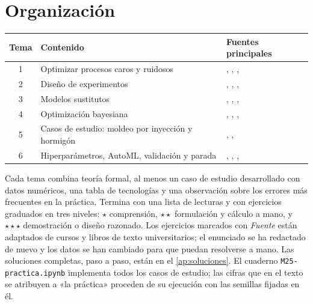 \documentclass[11pt,a4paper,twoside,openany]{book}
\begin{document}
\section*{Organización}
\begin{center}\small
\begin{tabular}{@{}cll@{}}
\toprule
Tema & Contenido & Fuentes principales \\
\midrule
1 & Optimizar procesos caros y ruidosos & \cite{garnett}, \cite{frazier}, \cite{kw}, \cite{mn} \\
2 & Diseño de experimentos & \cite{montgomery}, \cite{psu503}, \cite{mckay}, \cite{boxwilson} \\
3 & Modelos sustitutos & \cite{rw}, \cite{garnett}, \cite{lakshmi}, \cite{raissi} \\
4 & Optimización bayesiana & \cite{jones}, \cite{frazier}, \cite{garnett}, \cite{srinivas} \\
5 & Casos de estudio: moldeo por inyección y hormigón & \cite{fernandes}, \cite{ament}, \cite{shields} \\
6 & Hiperparámetros, AutoML, validación y parada & \cite{feurer}, \cite{bergstra12}, \cite{tpe}, \cite{hyperband} \\
\bottomrule
\end{tabular}
\end{center}

Cada tema combina teoría formal, al menos un caso de estudio desarrollado con datos numéricos, una tabla de tecnologías y una observación sobre los errores más frecuentes en la práctica. Termina con una lista de lecturas y con ejercicios graduados en tres niveles: $\star$ comprensión, $\star\star$ formulación y cálculo a mano, y $\star\star\star$ demostración o diseño razonado. Los ejercicios marcados con \emph{Fuente} están adaptados de cursos y libros de texto universitarios; el enunciado se ha redactado de nuevo y los datos se han cambiado para que puedan resolverse a mano. Las soluciones completas, paso a paso, están en el \cref{ap:soluciones}. El cuaderno \texttt{M25-practica.ipynb} implementa todos los casos de estudio; las cifras que en el texto se atribuyen a «la práctica» proceden de su ejecución con las semillas fijadas en él.
\end{document}
